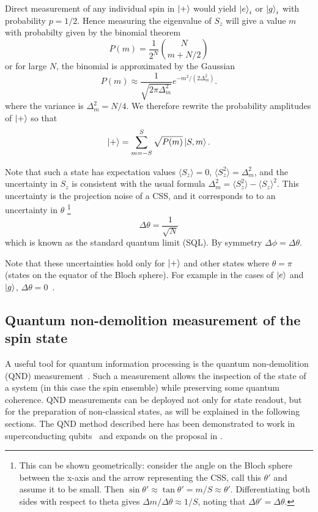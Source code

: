 Direct measurement of any individual spin in $\ket{+}$ would yield $\ket{e}_i$
or $\ket{g}_i$ with probability $p=1/2$. Hence measuring the eigenvalue of
$S_z$ will give a value $m$ with probabilty given by the binomial
theorem~\cite{Gazeau2009}
%
\begin{equation}
  P(m) = \frac{1}{2^N} \binom{N}{m+N/2}
\end{equation}
%
or for large $N$, the binomial is approximated by the Gaussian
%
\begin{equation}
  P(m) \approx\frac{1}{\sqrt{2\pi \Delta_m^2}} e^{-m^2/(2\Delta_m^2)}.
  \label{eqn:CSSmprob}
\end{equation}
%
where the variance is $\Delta_m^2 = N/4$. We therefore rewrite the probability
amplitudes of $\ket{+}$ so that
%
\begin{equation}
  \ket{+} = \sum_{m=-S}^S \sqrt{P(m)}\ket{S,m}.
  \label{squeeze:eqn:plusdicke}
\end{equation}

Note that such a state has expectation values $\langle S_z \rangle = 0$,
$\langle S_z^2\rangle = \Delta_m^2$, and the uncertainty in $S_z$ is consistent
with the usual formula $\Delta_m^2 = \langle S_z^2 \rangle - \langle
S_z\rangle^2$. This uncertainty is the projection noise of a CSS, and it
corresponds to to an uncertainty in $\theta$
%
\footnote{This can be shown geometrically: consider the angle on the Bloch
sphere between the x-axis and the arrow representing the CSS, call this
$\theta'$ and assume it to be small. Then $\sin
\theta' \approx \tan \theta' = m/S \approx \theta'$. Differentiating both sides
with respect to theta gives $\Delta m / \Delta \theta \approx 1/S$, noting that
$\Delta \theta' = \Delta \theta$.
}
%
\begin{equation}
  \Delta\theta = \frac{1}{\sqrt{N}}
\end{equation}
which is known as the standard quantum limit (SQL). By symmetry $\Delta \phi =
\Delta \theta$.

Note that these uncertainties hold only for $\ket{+}$ and other states where
$\theta = \pi$ (states on the equator of the Bloch sphere). For example in the
cases of $\ket{e}$ and $\ket{g}$, $\Delta \theta = 0$~\cite{PhysRevA.47.3554}.

\subsection{Quantum non-demolition measurement of the spin state}

A useful tool for quantum information processing is the quantum non-demolition
(QND) measurement~\cite{}. Such a measurement allows the inspection of the
state of a system (in this case the spin ensemble) while preserving some
quantum coherence. QND measurements can be deployed not only for state readout,
but for the preparation of non-classical states, as will be explained in the
following sections. The QND method described here has been demonstrated to work
in superconducting qubits~\cite{PhysRevA.69.062320} and expands on the proposal
in \cite{Andre2006}.

